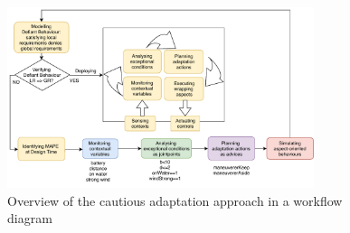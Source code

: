 
\begin{figure}[h]\centering
 \includegraphics[width=0.8\textwidth]{figures/workflow}
 \caption{Overview of the cautious adaptation approach in a workflow diagram}
 \label{fig:process}
 \vspace*{-0.5cm}
\end{figure}




